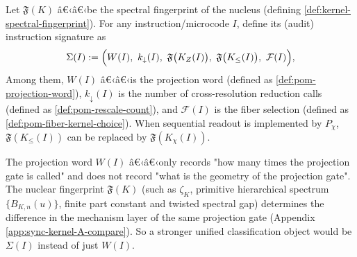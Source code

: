 \begin{definition}\label{def:pom-instruction-signature}
Let $\mathfrak{F}(K)$ â€‹â€‹be the spectral fingerprint of the nucleus (defining \ref{def:kernel-spectral-fingerprint}). For any instruction/microcode $I$, define its (audit) instruction signature as
$$
\Sigma(I):=\Bigl(W(I),\ k_{\downarrow}(I),\ \mathfrak{F}\bigl(K_Z(I)\bigr),\ \mathfrak{F}\bigl(K_{\le}(I)\bigr),\ \mathcal{F}(I)\Bigr),
$$
Among them, $W(I)$ â€‹â€‹is the projection word (defined as \ref{def:pom-projection-word}), $k_{\downarrow}(I)$ is the number of cross-resolution reduction calls (defined as \ref{def:pom-rescale-count}), and $\mathcal{F}(I)$ is the fiber selection (defined as \ref{def:pom-fiber-kernel-choice}). When sequential readout is implemented by $P_\chi$, $\mathfrak{F}(K_{\le}(I))$ can be replaced by $\mathfrak{F}(K_{\chi}(I))$.
\end{definition}

\begin{remark}\label{rem:pom-signature-why}
The projection word $W(I)$ â€‹â€‹only records "how many times the projection gate is called" and does not record "what is the geometry of the projection gate". The nuclear fingerprint $\mathfrak{F}(K)$ (such as $\zeta_K$, primitive hierarchical spectrum $\{B_{K,n}(u)\}$, finite part constant and twisted spectral gap) determines the difference in the mechanism layer of the same projection gate (Appendix \ref{app:sync-kernel-A-compare}). So a stronger unified classification object would be $\Sigma(I)$ instead of just $W(I)$.
\end{remark}

